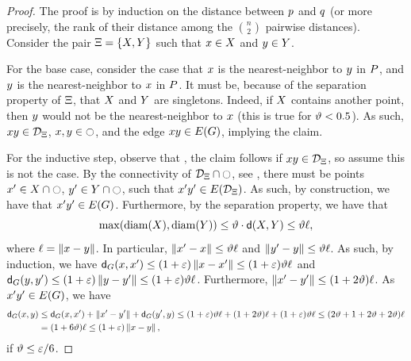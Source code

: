 \documentclass[12pt]{article}%
\begin{document}
\begin{proof}
    The proof is by induction on the distance between $p$ and $q$
    (or more precisely, the rank of their distance among the
    $\binom{n}{2}$ pairwise distances).  Consider the pair
    $\Xi = \{ X, Y \}$ such that $x \in X$ and
    $y \in Y$.

    For the base case, consider the case that $x$ is the
    nearest-neighbor to $y$ in $P$, and $y$ is the
    nearest-neighbor to $x$ in $P$.  It must be, because of the
    separation property of $\Xi$, that $X$ and $Y$ are
    singletons. Indeed, if $X$ contains another point, then $y$
    would not be the nearest-neighbor to $x$ (this is true for
    $\vartheta < 0.5$). As such, $x y \in \mathcal{D}_\Xi$,
    $x, y \in \ocircle$, and the edge $\px \py \in \EGX{\G}$,
    implying the claim.

    For the inductive step, observe that , the claim follows if
    $x y \in \mathcal{D}_\Xi$, so assume this is not the case. By the
    connectivity of $\mathcal{D}_\Xi \cap \ocircle$, see
    , there must be points
    $x' \in X \cap \ocircle$, $y' \in Y \cap \ocircle$, such that
    $\px'\py' \in \EGX{ \DT_\Pair}$. As such, by construction, we have
    that $\px'\py' \in \EGX{\G}$. Furthermore, by the separation
    property, we have that
    \begin{equation*}
        \max \pth{ \diameterX{\PSX}, \diameterX{\PSY} }%
        \leq%
        \epsA \cdot \dsY{\PSX}{\PSY}%
        \leq%
        \epsA \ell, 
    \end{equation*}
    where $\ell = \left\| x - y \right\|$. In particular,
    $\left\| x' - x \right\| \leq \vartheta \ell$ and
    $\left\| y' - y \right\| \leq \vartheta \ell$. As such, by induction, we have
    $\dGZ{\G}{\px}{\px'} \leq (1+\eps)\dY{\px}{\px'} \leq
    (1+\eps)\epsA \ell$ and
    $\dGZ{\G}{\py}{\py'} \leq (1+\eps)\dY{\py}{\py'} \leq
    (1+\eps)\epsA \ell$.  Furthermore,
    $\left\| x' - y' \right\| \leq (1+2\vartheta)\ell$. As $\px'\py' \in \EGX{\G}$,
    we have
    \begin{align*}
      \dGZ{\G}{\px}{\py}%
      &\leq%
        \dGZ{\G}{\px}{\px'}%
        +\dY{\px'}{\py'}
        +
        \dGZ{\G}{\py'}{\py}%
        \leq%
        (1+\eps)\epsA \ell
        +(1+2\epsA)\ell
        + (1+\eps)\epsA \ell
        \leq%
        \pth{ 2\epsA +1+2\epsA + 2\epsA } \ell        
      \\&%
      =%
      \pth{ 1+ 6\epsA  } \ell        
      \leq%
      \pth{ 1+ \eps  } \dY{\px}{\py},
    \end{align*}
    if $\vartheta \leq \varepsilon/6$.
\end{proof}
\end{document}
